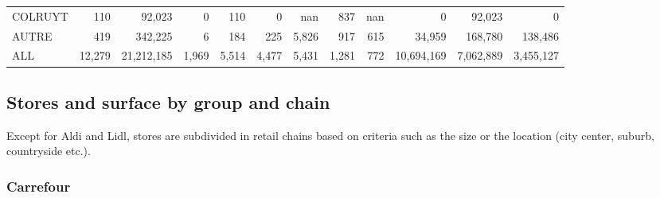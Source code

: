 \documentclass[11pt]{article}
\begin{document}
\begin{table}[H]
\begin{tabular}{l|rr|rrr|rrr|rrr}
COLRUYT        &        110 &      92,023 &          0 &        110 &          0 &        nan &        837 &        nan &          0 &     92,023 &          0 \\
AUTRE          &        419 &     342,225 &          6 &        184 &        225 &      5,826 &        917 &        615 &     34,959 &    168,780 &    138,486 \\
\midrule
ALL            &     12,279 &  21,212,185 &      1,969 &      5,514 &      4,477 &      5,431 &      1,281 &        772 & 10,694,169 &  7,062,889 &  3,455,127 \\
\bottomrule
\end{tabular}

\end{table}

\subsection{Stores and surface by group and chain}

Except for Aldi and Lidl, stores are subdivided in retail chains based on criteria such as the size or the location (city center, suburb, countryside etc.).

\subsubsection{Carrefour}
\end{document}

